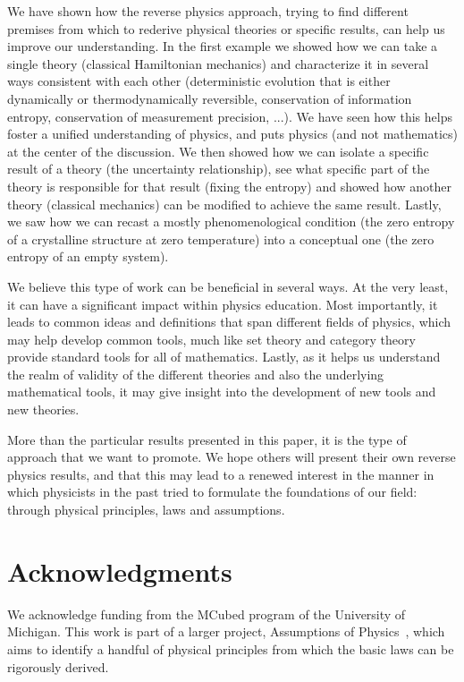 \documentclass[10pt,twocolumn, nofootinbib]{revtex4-2}
\begin{document}
We have shown how the reverse physics approach, trying to find different premises from which to rederive physical theories or specific results, can help us improve our understanding. In the first example we showed how we can take a single theory (classical Hamiltonian mechanics) and characterize it in several ways consistent with each other (deterministic evolution that is either dynamically or thermodynamically reversible, conservation of information entropy, conservation of measurement precision, ...). We have seen how this helps foster a unified understanding of physics, and puts physics (and not mathematics) at the center of the discussion. We then showed how we can isolate a specific result of a theory (the uncertainty relationship), see what specific part of the theory is responsible for that result (fixing the entropy) and showed how another theory (classical mechanics) can be modified to achieve the same result. Lastly, we saw how we can recast a mostly phenomenological condition (the zero entropy of a crystalline structure at zero temperature) into a conceptual one (the zero entropy of an empty system).

We believe this type of work can be beneficial in several ways. At the very least, it can have a significant impact within physics education. Most importantly, it leads to common ideas and definitions that span different fields of physics, which may help develop common tools, much like set theory and category theory provide standard tools for all of mathematics. Lastly, as it helps us understand the realm of validity of the different theories and also the underlying mathematical tools, it may give insight into the development of new tools and new theories.

More than the particular results presented in this paper, it is the type of approach that we want to promote. We hope others will present their own reverse physics results, and that this may lead to a renewed interest in the manner in which physicists in the past tried to formulate the foundations of our field: through physical principles, laws and assumptions.

\section*{Acknowledgments}
We acknowledge funding from the MCubed program of the University of Michigan. This work is part of a larger project, Assumptions of Physics~\cite{aop-book}, which aims to identify a handful of physical principles from which the basic laws can be rigorously derived.
\end{document}
